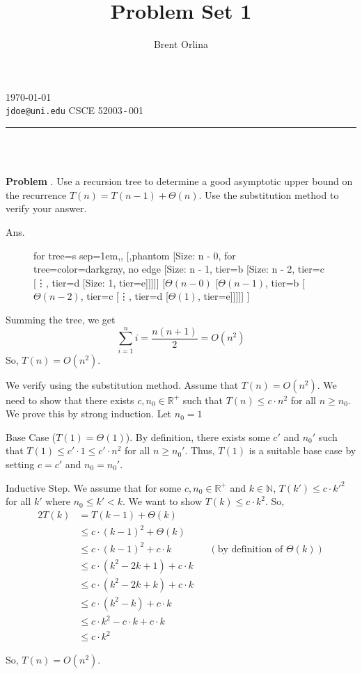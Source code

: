 \documentclass[11pt]{article}
\author{Brent Orlina}
\title{Problem Set 1}
\makeatletter
\newcommand{\bb}[1]{\mathbb{#1}}
\newcounter{problem}
\newcommand{\problem}[1]{
    \refstepcounter{problem}
    \noindent\textbf{Problem \theproblem}. #1
}
\theoremstyle{claim}
\newcommand{\answer}[1]{
    \noindent Ans. #1
}
\newcommand{\@email}{jdoe@uni.edu}
\newcommand{\@class}{CSCE 52003}
\newcommand{\@classsection}{001}
\newcommand{\@duedate}{\today}
\renewcommand{\maketitle}{
    \begin{center}
        \normalsize{\@author \hfill \@duedate} \\
        \normalsize{\texttt{\@email} \hfill \@class\,-\,\@classsection} \\
        \vspace{-0.75em}
        \rule{\textwidth}{0.05em} \\
        \vspace{0.75em}
        \Large\textbf{\@title} \\
        \vspace{1.5em}
    \end{center}
}
\makeatother
\begin{document}
\maketitle

\problem{\label{prb:problem-1}%
    Use a recursion tree to determine a good asymptotic upper bound on the recurrence \(T(n) = T(n - 1) + \Theta(n)\). Use the substitution method to verify your answer.
}

\answer{
\begin{figure}[h]
\centering
\begin{forest}
for tree={s sep=1em,},
[,phantom
    [Size: n - 0, for tree={color=darkgray, no edge}
    [Size: n - 1, tier=b
    [Size: n - 2, tier=c
    [\vdots,      tier=d
    [Size: 1, tier=e]]]]]                   
%
    [\(\Theta(n-0)\)
    [\(\Theta(n-1)\), tier=b
    [\(\Theta(n-2)\), tier=c 
    [\vdots,        tier=d
    [\(\Theta(1)\), tier=e]]]]] 
]
\end{forest}
\end{figure}

\noindent
Summing the tree, we get
\[\sum_{i=1}^{n} i = \frac{n(n+1)}{2} = O(n^2)\]
So, \(T(n) = O(n^2)\).

\noindent
We verify using the substitution method. Assume that \(T(n) = O(n^2)\). We need to show that there exists \(c, n_0 \in \bb{R}^+\) such that \(T(n) \leq c \cdot n^2\) for all \(n \geq n_0\). We prove this by strong induction. Let \(n_0 = 1\)

\noindent
Base Case (\(T(1) = \Theta(1)\)). By definition, there exists some \(c'\) and \(n_0'\) such that \(T(1) \leq c' \cdot 1 \leq c' \cdot n^2\) for all \(n \geq n_0'\). Thus, \(T(1)\) is a suitable base case by setting \(c = c'\) and \(n_0 = n_0'\).

\noindent
Inductive Step. We assume that for some \(c, n_0 \in \bb{R}^+\) and \(k \in \bb{N}\), \(T(k') \leq c \cdot k'^2\) for all \(k'\) where \(n_0 \leq k' < k\). We want to show \(T(k) \leq c \cdot k^2\). So,
\begin{alignat*}{2}
    T(k) &= T(k - 1) + \Theta(k)\\
         &\leq c \cdot (k - 1)^2 + \Theta(k)\\
         &\leq c \cdot (k - 1)^2 + c \cdot k\qquad\ && (\text{by definition of } \Theta(k))\\
         &\leq c \cdot (k^2 - 2k + 1) + c \cdot k\\
         &\leq c \cdot (k^2 - 2k + k) + c \cdot k\\
         &\leq c \cdot (k^2 - k) + c \cdot k\\
         &\leq c \cdot k^2 - c \cdot k + c \cdot k\\
         &\leq c \cdot k^2
\end{alignat*}

\noindent
So, \(T(n) = O(n^2)\).
}
\end{document}
